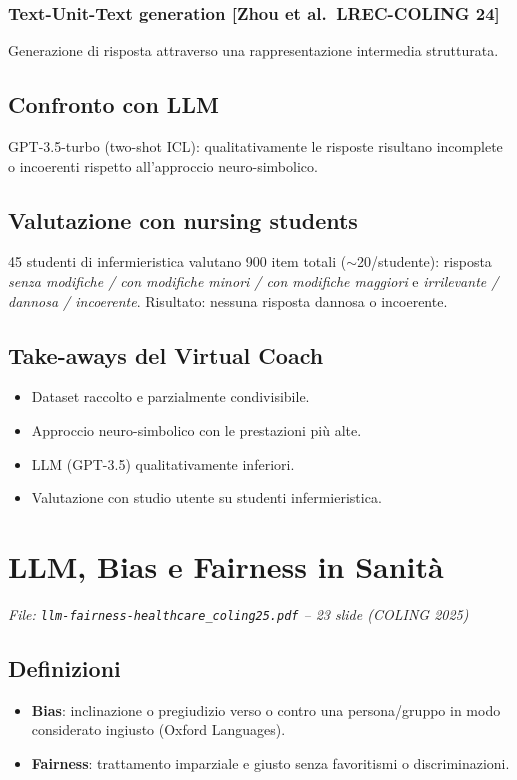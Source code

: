 \documentclass[a4paper,12pt]{article}
\begin{document}
\subsubsection{Text-Unit-Text generation [Zhou et al.\ LREC-COLING 24]}
Generazione di risposta attraverso una rappresentazione intermedia strutturata.

\subsection{Confronto con LLM}
GPT-3.5-turbo (two-shot ICL): qualitativamente le risposte risultano incomplete o incoerenti rispetto all'approccio neuro-simbolico.

\subsection{Valutazione con nursing students}
45 studenti di infermieristica valutano 900 item totali ($\sim$20/studente): risposta \textit{senza modifiche / con modifiche minori / con modifiche maggiori} e \textit{irrilevante / dannosa / incoerente}. Risultato: nessuna risposta dannosa o incoerente.

\subsection{Take-aways del Virtual Coach}
\begin{itemize}
    \item Dataset raccolto e parzialmente condivisibile.
    \item Approccio neuro-simbolico con le prestazioni pi\`u alte.
    \item LLM (GPT-3.5) qualitativamente inferiori.
    \item Valutazione con studio utente su studenti infermieristica.
\end{itemize}

\section{LLM, Bias e Fairness in Sanit\`a}
\textit{File: \texttt{llm-fairness-healthcare\_coling25.pdf} -- 23 slide (COLING 2025)}

\subsection{Definizioni}
\begin{itemize}
    \item \textbf{Bias}: inclinazione o pregiudizio verso o contro una persona/gruppo in modo considerato ingiusto (Oxford Languages).
    \item \textbf{Fairness}: trattamento imparziale e giusto senza favoritismi o discriminazioni.
\end{itemize}
\end{document}
